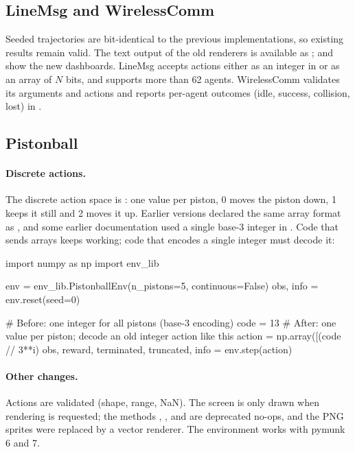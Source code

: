 \subsection{LineMsg and WirelessComm}\label{sec:migration-networked}

Seeded trajectories are bit-identical to the previous implementations, so
existing results remain valid. The text output of the old renderers is
available as ;  and 
show the new dashboards. LineMsg accepts actions either as an integer in
 or as an array of $N$ bits, and
 supports more than 62 agents.
WirelessComm validates its arguments and actions and reports per-agent
outcomes (idle, success, collision, lost) in .

\subsection{Pistonball}\label{sec:migration-pistonball}

\paragraph{Discrete actions.}
The discrete action space is : one
value per piston, 0 moves the piston down, 1 keeps it still and 2 moves it up.
Earlier versions declared the same array format as
, and some earlier documentation used a
single base-3 integer in . Code that sends
arrays keeps working; code that encodes a single integer must decode it:

\begin{pycode}
import numpy as np
import env_lib

env = env_lib.PistonballEnv(n_pistons=5, continuous=False)
obs, info = env.reset(seed=0)

# Before: one integer for all pistons (base-3 encoding)
code = 13
# After: one value per piston; decode an old integer action like this
action = np.array([(code // 3**i) %
obs, reward, terminated, truncated, info = env.step(action)
\end{pycode}

\paragraph{Other changes.}
Actions are validated (shape, range, NaN). The screen is only drawn when
rendering is requested; the methods , ,
 and  are deprecated no-ops, and
the PNG sprites were replaced by a vector renderer. The environment works with
pymunk 6 and 7.

